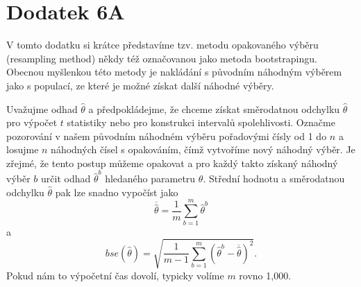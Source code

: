 \section{Dodatek 6A}
V tomto dodatku si krátce představíme tzv. metodu opakovaného výběru (resampling method) někdy též označovanou jako metoda bootstrapingu. 
Obecnou myšlenkou této metody je nakládání s původním náhodným výběrem jako s populací, ze které je možné získat další náhodné výběry.
 
Uvažujme odhad $\hat{\theta}$ a předpokládejme, že chceme získat směrodatnou odchylku $\hat{\theta}$ pro výpočet $t$ statistiky nebo pro 
konstrukci intervalů spolehlivosti. Označme pozorování v našem původním náhodném výběru pořadovými čísly od 1 do $n$ a losujme $n$ 
náhodných čísel s opakováním, čímž vytvoříme nový náhodný výběr. Je zřejmé, že tento postup můžeme opakovat a pro každý takto 
získaný náhodný výběr $b$ určit odhad $\hat{\theta}^b$ hledaného parametru $\theta$. Střední hodnotu a směrodatnou 
odchylku $\hat{\theta}$ pak lze snadno vypočíst jako
\begin{equation}
\overline{\hat{\theta}} = \frac{1}{m}\sum_{b = 1}^m \hat{\theta}^b
\end{equation}
a
\begin{equation}
bse(\hat{\theta}) = \sqrt{\frac{1}{m - 1} \sum_{b = 1}^m (\hat{\theta}^b - \overline{\hat{\theta}})^2}.
\end{equation}
Pokud nám to výpočetní čas dovolí, typicky volíme $m$ rovno 1,000.
